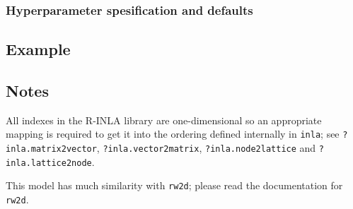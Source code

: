 \documentclass[a4paper,11pt]{article}
\begin{document}
\subsubsection*{Hyperparameter spesification and defaults}



\subsection*{Example}



\subsection*{Notes}
All indexes in the R-INLA library are one-dimensional so an
appropriate mapping is required to get it into the ordering defined
internally in \verb|inla|; see \verb|?inla.matrix2vector|,
\verb|?inla.vector2matrix|, \verb|?inla.node2lattice| and
\verb|?inla.lattice2node|.

This model has much similarity with \verb|rw2d|; please read the
documentation for \verb|rw2d|.

\end{document}

